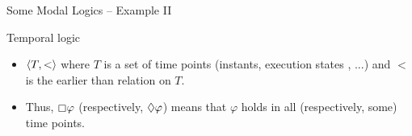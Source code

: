 \documentclass[aspectratio=169]{beamer}
\begin{document}
\begin{slide}{Some Modal Logics -- Example II}\label{s:18}
\small
\begin{block}{Temporal logic}
\begin{itemize}
\item $\langle T, < \rangle$ where $T$ is a set of time points (instants, execution states , ...) and $<$ is the \alert{earlier than} relation on $T$.
\item Thus, $\boxempty \varphi$ (respectively, $\Diamond \varphi$) means that $\varphi$ holds in all (respectively, some)  time points.
\end{itemize}
\end{block}
\end{slide}



\end{document}
